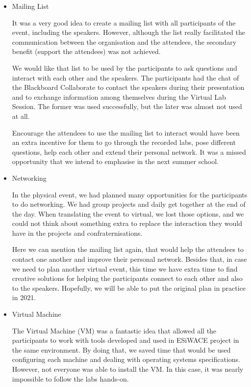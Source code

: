 \begin{itemize}

\item Mailing List

It was a very good idea to create a mailing list with all participants of the event, including the speakers. However, although the list really facilitated the communication between the organisation and the attendees, the secondary benefit (support the attendees) was not achieved.

We would like that list to be used by the participants to ask questions and interact with each other and the speakers. The participants had the chat of the Blackboard Collaborate to contact the speakers during their presentation and to exchange information among themselves during the Virtual Lab Session. The former was used successfully, but the later was almost not used at all.

Encourage the attendees to use the mailing list to interact would have been an extra incentive for them to go through the recorded labs, pose different questions, help each other and extend their personal network. It was a missed opportunity that we intend to emphasise in the next summer school.

\item Networking

In the physical event, we had planned many opportunities for the participants to do networking. We had group projects and daily get together at the end of the day. When translating the event to virtual, we lost those options, and we could not think about something extra to replace the interaction they would have in the projects and confraternisations.

Here we can mention the mailing list again, that would help the attendees to contact one another and improve their personal network. Besides that, in case we need to plan another virtual event, this time we have extra time to find creative solutions for helping the participants connect to each other and also to the speakers. Hopefully, we will be able to put the original plan in practice in 2021.

\item Virtual Machine

The Virtual Machine (VM) was a fantastic idea that allowed all the participants to work with tools developed and used in ESiWACE project in the same environment. By doing that, we saved time that would be used configuring each machine and dealing with operating systems specifications. However, not everyone was able to install the VM. In this case, it was nearly impossible to follow the labs hands-on.


\end{itemize}
